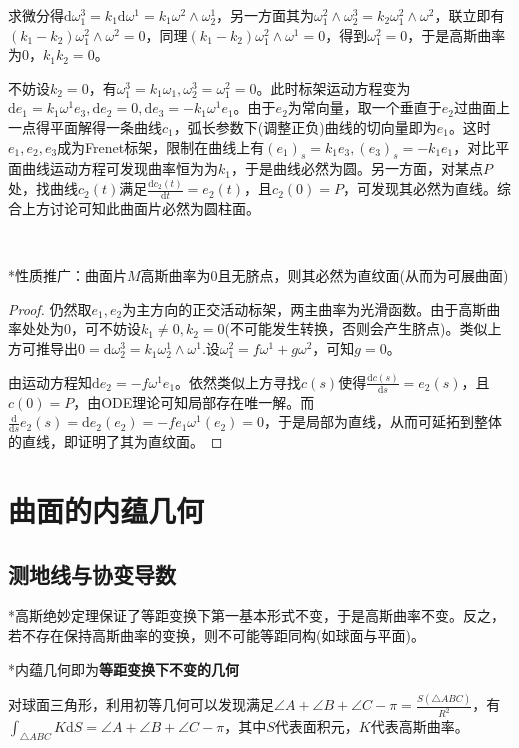 \documentclass[a4paper,UTF8,fontset=windows]{ctexart}
\begin{document}
求微分得$\mathrm{d}\omega_1^3=k_1\mathrm{d}\omega^1=k_1\omega^2\wedge\omega_2^1$，另一方面其为$\omega_1^2\wedge\omega_2^3=k_2\omega_1^2\wedge\omega^2$，联立即有$(k_1-k_2)\omega_1^2\wedge\omega^2=0$，同理$(k_1-k_2)\omega_1^2\wedge\omega^1=0$，得到$\omega_1^2=0$，于是高斯曲率为0，$k_1k_2=0$。

不妨设$k_2=0$，有$\omega_1^3=k_1\omega_1,\omega_2^3=\omega_1^2=0$。此时标架运动方程变为$\mathrm{d}e_1=k_1\omega^1e_3,\mathrm{d}e_2=0,\mathrm{d}e_3=-k_1\omega^1e_1$。由于$e_2$为常向量，取一个垂直于$e_2$过曲面上一点得平面解得一条曲线$c_1$，弧长参数下(调整正负)曲线的切向量即为$e_1$。这时$e_1,e_2,e_3$成为Frenet标架，限制在曲线上有$(e_1)_s=k_1e_3,(e_3)_s=-k_1e_1$，对比平面曲线运动方程可发现曲率恒为为$k_1$，于是曲线必然为圆。另一方面，对某点$P$处，找曲线$c_2(t)$满足$\frac{\mathrm{d}c_2(t)}{\mathrm{d}t}=e_2(t)$，且$c_2(0)=P$，可发现其必然为直线。综合上方讨论可知此曲面片必然为圆柱面。

\

*性质推广：曲面片$M$高斯曲率为0且无脐点，则其必然为直纹面(从而为可展曲面)

\begin{proof}
仍然取$e_1,e_2$为主方向的正交活动标架，两主曲率为光滑函数。由于高斯曲率处处为0，可不妨设$k_1\ne0,k_2=0$(不可能发生转换，否则会产生脐点)。类似上方可推导出$0=\mathrm{d}\omega_2^3=k_1\omega_2^1\wedge\omega^1$.设$\omega_1^2=f\omega^1+g\omega^2$，可知$g=0$。

由运动方程知$\mathrm{d}e_2=-f\omega^1e_1$。依然类似上方寻找$c(s)$使得$\frac{\mathrm{d}c(s)}{\mathrm{d}s}=e_2(s)$，且$c(0)=P$，由ODE理论可知局部存在唯一解。而$\frac{\mathrm{d}}{\mathrm{d}s}e_2(s)=\mathrm{d}e_2(e_2)=-fe_1\omega^1(e_2)=0$，于是局部为直线，从而可延拓到整体的直线，即证明了其为直纹面。
\end{proof}

\section{曲面的内蕴几何}
\subsection{测地线与协变导数}
*高斯绝妙定理保证了等距变换下第一基本形式不变，于是高斯曲率不变。反之，若不存在保持高斯曲率的变换，则不可能等距同构(如球面与平面)。

*内蕴几何即为\textbf{等距变换下不变的几何}

对球面三角形，利用初等几何可以发现满足$\angle A+\angle B+\angle C -\pi=\frac{S(\triangle ABC)}{R^2}$，有$\int_{\triangle ABC}K\mathrm{d}S=\angle A+\angle B+\angle C -\pi$，其中$S$代表面积元，$K$代表高斯曲率。
\end{document}
